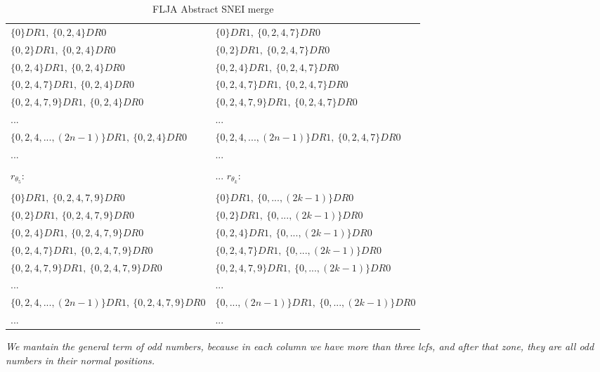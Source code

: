 \begin{table}[h!]
\begin{center}
\begin{tabular}{|l||l|}
					\cellcolor{brightlavender!50} & \cellcolor{brightlavender!50}  \\
				\hline
				\hline
					$\{0\}DR1,\:\{0, 2, 4\}DR0$ &
					$\{0\}DR1,\:\{0, 2, 4, 7\}DR0$ \\
					$\{0, 2\}DR1,\:\{0, 2, 4\}DR0$ &
					$\{0, 2\}DR1,\:\{0, 2, 4, 7\}DR0$ \\
					$\{0, 2, 4\}DR1,\:\{0, 2, 4\}DR0$ &
					$\{0, 2, 4\}DR1,\:\{0, 2, 4, 7\}DR0$ \\
					$\{0, 2, 4, 7\}DR1,\:\{0, 2, 4\}DR0$ &
					$\{0, 2, 4, 7\}DR1,\:\{0, 2, 4, 7\}DR0$ \\
					$\{0, 2, 4, 7, 9\}DR1,\:\{0, 2, 4\}DR0$ &
					$\{0, 2, 4, 7, 9\}DR1,\:\{0, 2, 4, 7\}DR0$ \\
					... & ... \\
					$\{0, 2, 4, ... , (2n-1)\}DR1,\:\{0, 2, 4\}DR0$ &
					$\{0, 2, 4, ... , (2n-1)\}DR1,\:\{0, 2, 4, 7\}DR0$ \\
					... & ... \\				
				\hline
				\hline
					\cellcolor{brightlavender!50} & \cellcolor{brightlavender!50}  \\
					\cellcolor{brightlavender!50} {\LARGE $r_{\theta_{5}}$:  } & \cellcolor{brightlavender!50}... {\LARGE $r_{\theta_{k}}$:  } \\
					\cellcolor{brightlavender!50} & \cellcolor{brightlavender!50}  \\
				\hline
				\hline
					$\{0\}DR1,\:\{0, 2, 4, 7, 9\}DR0$ &
					$\{0\}DR1,\:\{0, ... , (2k-1)\}DR0$ \\
					$\{0, 2\}DR1,\:\{0, 2, 4, 7, 9\}DR0$ &
					$\{0, 2\}DR1,\:\{0, ... , (2k-1)\}DR0$ \\
					$\{0, 2, 4\}DR1,\:\{0, 2, 4, 7, 9\}DR0$ &
					$\{0, 2, 4\}DR1,\:\{0, ... , (2k-1)\}DR0$ \\
					$\{0, 2, 4, 7\}DR1,\:\{0, 2, 4, 7, 9\}DR0$ &
					$\{0, 2, 4, 7\}DR1,\:\{0, ... , (2k-1)\}DR0$ \\
					$\{0, 2, 4, 7, 9\}DR1,\:\{0, 2, 4, 7, 9\}DR0$ &
					$\{0, 2, 4, 7, 9\}DR1,\:\{0, ... , (2k-1)\}DR0$ \\
					... & ... \\
					$\{0, 2, 4, ... , (2n-1)\}DR1,\:\{0, 2, 4, 7, 9\}DR0$ &
					$\{0, ... , (2n-1)\}DR1,\:\{0, ... , (2k-1)\}DR0$ \\
					... & ... \\
				\hline
			\end{tabular}
			\caption{FLJA Abstract SNEI merge}
			\label{tab:flja_snei_merge}
		\end{center}
	\end{table}
	
	\noindent
	\textit{We mantain the general term of odd numbers, because in each column we have more than three lcfs, and after that zone, they are all odd numbers in their normal positions.}
	\\\\
	
	